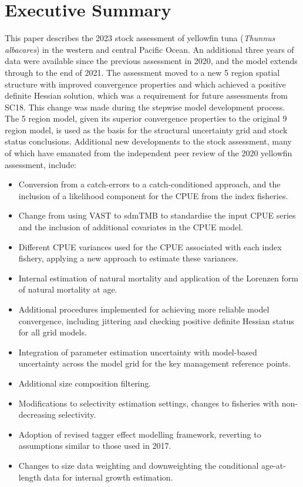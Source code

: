 
\section{Executive Summary}

This paper describes the 2023 stock assessment of yellowfin tuna (\emph{Thunnus albacares}) in the western and central Pacific Ocean. An additional three years of data were available since the previous assessment in 2020, and the model extends through to the end of 2021. The assessment moved to a new 5 region spatial structure with improved convergence properties and which achieved a positive definite Hessian solution, which was a requirement for future assessments from SC18. This change was made during the stepwise model development process. The 5 region model, given its superior convergence properties to the original 9 region model, is used as the basis for the structural uncertainty grid and stock status conclusions. Additional new developments to the stock assessment, many of which have emanated from the independent peer review of the 2020 yellowfin assessment, include:

\begin{itemize}
  \item Conversion from a catch-errors to a catch-conditioned approach, and the inclusion of a likelihood component for the CPUE from the index fisheries.
  \item Change from using VAST to sdmTMB to standardise the input CPUE series and the inclusion of additional covariates in the CPUE model.
  \item Different CPUE variances used for the CPUE associated with each index fishery, applying a new approach to estimate these variances.
  \item Internal estimation of natural mortality and application of the Lorenzen form of natural mortality at age.
  \item Additional procedures implemented for achieving more reliable model convergence, including jittering and checking positive definite Hessian status for all grid models.
  \item Integration of parameter estimation uncertainty with model-based uncertainty across the model grid for the key management reference points.
  \item Additional size composition filtering.
  \item Modifications to selectivity estimation settings, changes to fisheries with non-decreasing selectivity.
  \item Adoption of revised tagger effect modelling framework, reverting to assumptions similar to those used in 2017.
  \item Changes to size data weighting and downweighting the conditional age-at-length data for internal growth estimation.
\end{itemize}

